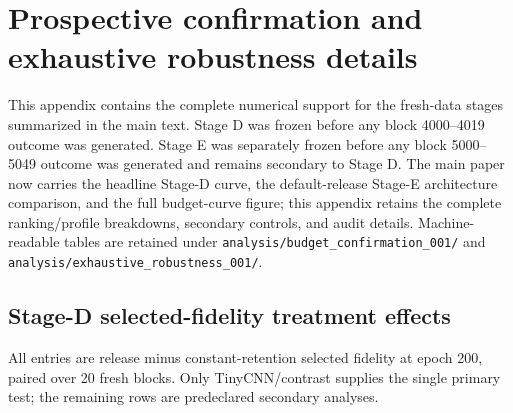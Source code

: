 \section{Prospective confirmation and exhaustive robustness details}\label{app:confirmation}

This appendix contains the complete numerical support for the fresh-data stages summarized in the main text. Stage D was frozen before any block 4000--4019 outcome was generated. Stage E was separately frozen before any block 5000--5049 outcome was generated and remains secondary to Stage D. The main paper now carries the headline Stage-D curve, the default-release Stage-E architecture comparison, and the full budget-curve figure; this appendix retains the complete ranking/profile breakdowns, secondary controls, and audit details. Machine-readable tables are retained under \texttt{analysis/budget\_confirmation\_001/} and \texttt{analysis/exhaustive\_robustness\_001/}.

\subsection{Stage-D selected-fidelity treatment effects}\label{app:stage-d-full}

All entries are release minus constant-retention selected fidelity at epoch 200, paired over 20 fresh blocks. Only TinyCNN/contrast supplies the single primary test; the remaining rows are predeclared secondary analyses.

